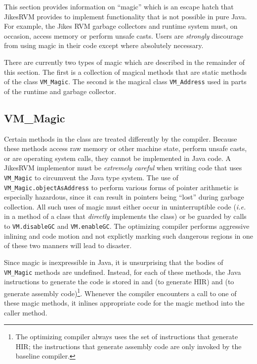 This section provides information on ``magic'' which is an escape
hatch that Jikes\trademark RVM provides to implement
functionality that is not 
possible in pure Java\trademark.  For example, the Jikes RVM garbage
collectors and 
runtime system must, on occasion, access memory or perform unsafe
casts.  Users are {\it strongly} discourage from using magic in their code
except where absolutely necessary.  

There are currently two types of magic which are described in the remainder of this
section.  The first is a collection of magical methods
that are static methods of the class {\tt VM\_Magic}.  The second is the magical class
{\tt VM\_Address} used in parts of the runtime and garbage collector.

\JikesTMFooter

\subsection{VM\_Magic}
Certain methods in the class 
are treated differently by the compiler. Because these methods access
raw memory or other machine state, perform unsafe casts, 
or are operating system calls, they cannot be implemented in Java
code.  A Jikes\trademark RVM implementor must be {\em extremely
careful} when writing 
code that uses {\tt VM\_Magic} to circumvent the Java type
system.  The use of {\tt VM\_Magic.objectAsAddress} to perform various
forms of pointer arithmetic is especially hazardous, since it can
result in pointers being ``lost'' during garbage collection. 
All such uses of magic must either occur in uninterruptible
code ({\it i.e.} in a method of a class that {\em directly} implements 
the  class) 
or be guarded by calls to {\tt VM.disableGC} and {\tt VM.enableGC}.  
The optimizing compiler performs aggressive inlining and code motion 
and not explictly marking such dangerous regions in one of these two manners 
will lead to disaster.

Since magic is inexpressible in Java, it is unsurprising that the bodies 
of {\tt VM\_Magic} methods are undefined.  Instead, for each of these methods, 
the Java instructions to generate the code is stored in 
 and 
 (to generate HIR) and 
 (to generate assembly code)\footnote{The optimizing
compiler always uses the set of instructions that generate HIR; the
instructions that generate assembly code are only invoked by the
baseline compiler.}.  Whenever the compiler encounters a call to one of these
magic methods, it inlines appropriate code for the magic method into the caller method.


